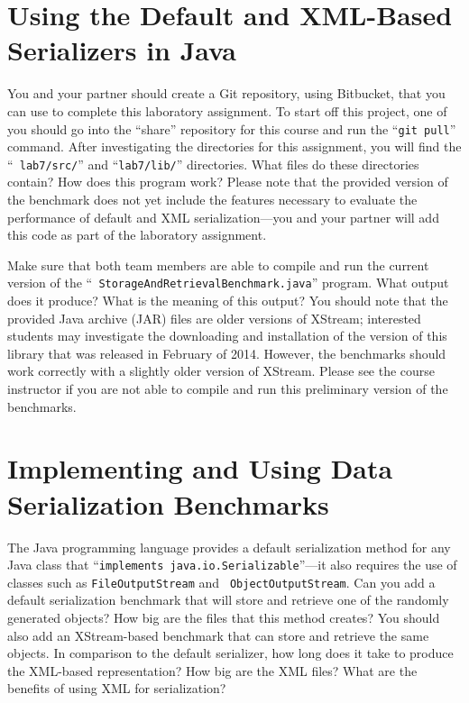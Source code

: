 \vspace*{-.05in}
\section*{Using the Default and XML-Based Serializers in Java}

You and your partner should create a Git repository, using Bitbucket, that you can use to complete this laboratory
assignment.  To start off this project, one of you should go into the ``share'' repository for this course and run the
``{\tt git pull}'' command. After investigating the directories for this assignment, you will find the ``{\tt
  lab7/src/}'' and ``{\tt lab7/lib/}'' directories. What files do these directories contain? How does this program work?
Please note that the provided version of the benchmark does not yet include the features necessary to evaluate the
performance of default and XML serialization---you and your partner will add this code as part of the laboratory
assignment.

Make sure that both team members are able to compile and run the current version of the ``{\tt
  StorageAndRetrievalBenchmark.java}'' program. What output does it produce? What is the meaning of this
output? You should note that the provided Java archive (JAR) files are older versions of XStream; interested students may
investigate the downloading and installation of the version of this library that was released in February of 2014.
However, the benchmarks should work correctly with a slightly older version of XStream. Please see the course instructor
if you are not able to compile and run this preliminary version of the benchmarks.

\vspace*{-.05in}
\section*{Implementing and Using Data Serialization Benchmarks}

The Java programming language provides a default serialization method for any Java class that ``{\tt implements
  java.io.Serializable}''---it also requires the use of classes such as {\tt FileOutputStream} and {\tt
  ObjectOutputStream}. Can you add a default serialization benchmark that will store and retrieve one of the randomly
generated objects? How big are the files that this method creates?  You should also add an XStream-based benchmark that
can store and retrieve the same objects. In comparison to the default serializer, how long does it take to produce the
XML-based representation? How big are the XML files? What are the benefits of using XML for serialization?

